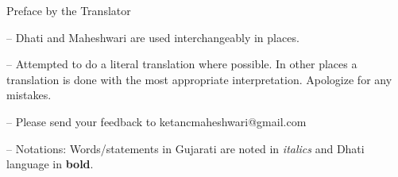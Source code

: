 Preface by the Translator

-- Dhati and Maheshwari are used interchangeably in places.

-- Attempted to do a literal translation where possible. In other places a translation is done with the most appropriate interpretation. Apologize for any mistakes.

-- Please send your feedback to ketancmaheshwari@gmail.com

-- Notations: Words/statements in Gujarati are noted in \textit{italics} and Dhati language in \textbf{bold}.


